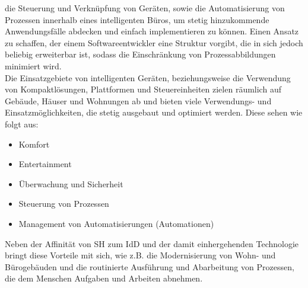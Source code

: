     die Steuerung und Verknüpfung von Geräten, sowie die Automatisierung von Prozessen innerhalb eines intelligenten Büros, um stetig hinzukommende 
    Anwendungsfälle abdecken und einfach implementieren zu können. Einen Ansatz zu schaffen, der einem Softwareentwickler eine Struktur vorgibt, die 
    in sich jedoch beliebig erweiterbar ist, sodass die Einschränkung von Prozessabbildungen minimiert wird. 
    \\ 
    \linebreak
    Die Einsatzgebiete von intelligenten Geräten, beziehungsweise die Verwendung von Kompaktlösungen, Plattformen und Steuereinheiten zielen räumlich 
    auf Gebäude, Häuser und Wohnungen ab und bieten viele Verwendungs- und Einsatzmöglichkeiten, die stetig ausgebaut und optimiert werden. 
    Diese sehen wie folgt aus: 
    \begin{itemize}
        \item Komfort
        \item Entertainment
        \item Überwachung und Sicherheit
        \item Steuerung von Prozessen
        \item Management von Automatisierungen (Automationen)
    \end{itemize}    
    Neben der Affinität von \acl{SH} zum \acl{IdD} und der damit einhergehenden Technologie bringt diese Vorteile mit sich, wie z.B. 
    die Modernisierung von Wohn- und Bürogebäuden und die routinierte Ausführung und Abarbeitung von Prozessen, die dem Menschen 
    Aufgaben und Arbeiten abnehmen.
\pagebreak
